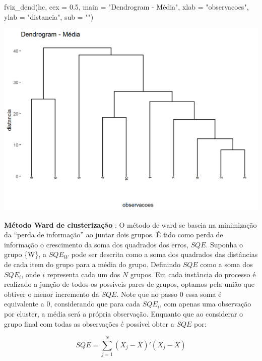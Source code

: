 \documentclass[
  letterpaper,
  DIV=11,
  numbers=noendperiod]{scrreprt}
\newenvironment{Shaded}{\begin{snugshade}}{\end{snugshade}}
\newcommand{\AttributeTok}[1]{\textcolor[rgb]{0.40,0.45,0.13}{#1}}
\newcommand{\FloatTok}[1]{\textcolor[rgb]{0.68,0.00,0.00}{#1}}
\newcommand{\FunctionTok}[1]{\textcolor[rgb]{0.28,0.35,0.67}{#1}}
\newcommand{\NormalTok}[1]{\textcolor[rgb]{0.00,0.23,0.31}{#1}}
\newcommand{\StringTok}[1]{\textcolor[rgb]{0.13,0.47,0.30}{#1}}
\begin{document}
\begin{Shaded}
\begin{Highlighting}[]
\FunctionTok{fviz\_dend}\NormalTok{(hc, }\AttributeTok{cex =} \FloatTok{0.5}\NormalTok{,}
          \AttributeTok{main =} \StringTok{"Dendrogram {-} Média"}\NormalTok{,}
          \AttributeTok{xlab =} \StringTok{"observacoes"}\NormalTok{, }\AttributeTok{ylab =} \StringTok{"distancia"}\NormalTok{, }\AttributeTok{sub =} \StringTok{""}\NormalTok{)}
\end{Highlighting}
\end{Shaded}

\includegraphics{./figuras_naosupervisionado/unnamed-chunk-9-1.png}

\textbf{Método Ward de clusterização} : O método de ward se baseia na
minimização da ``perda de informação'' ao juntar dois grupos. É tido
como perda de informação o crescimento da soma dos quadrados dos erros,
\(SQE\). Suponha o grupo \{W\}, a \(SQE_W\) pode ser descrita como a
soma dos quadrados das distâncias de cada item do grupo para a média do
grupo. Definindo \(SQE\) como a soma dos \(SQE_i\), onde \(i\)
representa cada um dos \(N\) grupos. Em cada instância do processo é
realizado a junção de todos os possiveis pares de grupos, optamos pela
união que obtiver o menor incremento da \(SQE\). Note que no passo 0
essa soma é equivalente a 0, considerando que para cada \(SQE_i\), com
apenas uma observação por cluster, a média será a própria observação.
Enquanto que ao considerar o grupo final com todas as observações é
possível obter a \(SQE\) por:

\[
SQE = \sum^N_{j=1}(X_j - \bar{X})'(X_j - \bar{X})
\]
\end{document}
